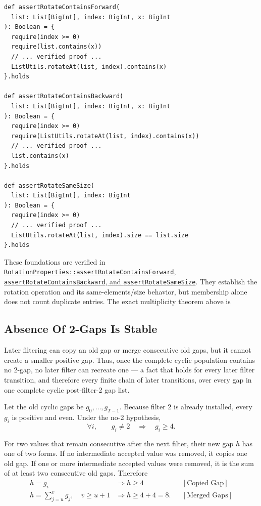 \begin{lstlisting}[style=scala]
def assertRotateContainsForward(
  list: List[BigInt], index: BigInt, x: BigInt
): Boolean = {
  require(index >= 0)
  require(list.contains(x))
  // ... verified proof ...
  ListUtils.rotateAt(list, index).contains(x)
}.holds

def assertRotateContainsBackward(
  list: List[BigInt], index: BigInt, x: BigInt
): Boolean = {
  require(index >= 0)
  require(ListUtils.rotateAt(list, index).contains(x))
  // ... verified proof ...
  list.contains(x)
}.holds

def assertRotateSameSize(
  list: List[BigInt], index: BigInt
): Boolean = {
  require(index >= 0)
  // ... verified proof ...
  ListUtils.rotateAt(list, index).size == list.size
}.holds
\end{lstlisting}

{\raggedright
These foundations are verified in
\href{https://github.com/thiagomata/prime-numbers/blob/master/src/main/scala/v1/chapter3/list/properties/RotationProperties.scala}{\texttt{RotationProperties::assertRotateContainsForward}, \texttt{assertRotateContainsBackward}, and \texttt{assertRotateSameSize}}.
They establish the rotation operation and its same-elements/size
behavior, but membership alone does not count duplicate entries. The
exact multiplicity theorem above is \par}

\subsection{Absence Of 2-Gaps Is Stable}
\label{sec:absence-of-two-gaps-is-stable}

Later filtering can copy an old gap or merge consecutive old gaps, but it
cannot create a smaller positive gap. Thus, once the complete cyclic
population contains no 2-gap, no later filter can recreate one --- a fact
that holds for every later filter transition, and therefore every finite
chain of later transitions, over every gap in one complete cyclic
post-filter-2 gap list.

Let the old cyclic gaps be $g_0,\ldots,g_{T-1}$. Because filter $2$ is
already installed, every $g_i$ is positive and even. Under the no-2
hypothesis,
\begin{equation*}
\forall i,\qquad g_i\ne2
\quad\Longrightarrow\quad
g_i\ge4.
\end{equation*}

For two values that remain consecutive after the next filter, their new
gap $h$ has one of two forms. If no intermediate accepted value was
removed, it copies one old gap. If one or more intermediate accepted
values were removed, it is the sum of at least two consecutive old gaps.
Therefore
\begin{equation*}
\begin{aligned}
h=g_i
&\Longrightarrow h\ge4
&&[\text{Copied Gap}]\\
h=\sum_{j=u}^{v}g_j,\quad v\ge u+1
&\Longrightarrow h\ge4+4=8.
&&[\text{Merged Gaps}]
\end{aligned}
\end{equation*}

